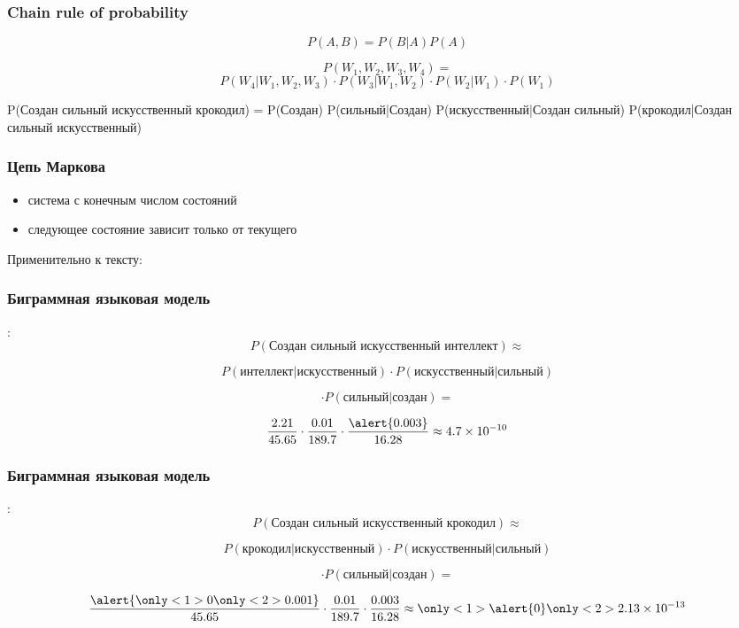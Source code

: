 \documentclass[10pt,svgnames]{beamer}
\begin{document}
\begin{frame}
  \frametitle{Chain rule of probability}
  \begin{equation}
    P(A,B)=P(B|A)P(A)
  \end{equation}

  $$
    P(W_1,W_2,W_3,W_4) = 
    $$
    $$
    P(W_4|W_1,W_2,W_3)  \cdot P(W_3|W_1,W_2)
    \cdot P(W_2|W_1) \cdot P(W_1)
    $$

    P(Создан сильный искусственный крокодил) =
    P(Создан) P(сильный|Создан)
    P(искусственный|Создан сильный)
    P(крокодил|Создан сильный искусственный)
\end{frame}

\begin{frame}
  \frametitle{Цепь Маркова}
  \begin{itemize}
  \item система с конечным числом состояний
  \item следующее состояние зависит только от текущего
  \end{itemize}
  Применительно к тексту: 

\end{frame}


\begin{frame}
  \frametitle{Биграммная языковая модель}
  :
  $$
  P(\text{Создан сильный искусственный интеллект}) \approx
  $$

  $$
  P(\text{интеллект}|\text{искусственный}) \cdot
  P(\text{искусственный}|\text{сильный})
  $$

  $$
  \cdot P(\text{сильный}|\text{создан}) =
  $$

  $$
  \frac{2.21}{45.65} \cdot \frac{0.01}{189.7} \cdot \frac{\alert{0.003}}{16.28} \approx
  4.7 \times 10^{-10}
  $$
\end{frame}

\begin{frame}
  \frametitle{Биграммная языковая модель}
  :
  $$
  P(\text{Создан сильный искусственный крокодил}) \approx
  $$

  $$
  P(\text{крокодил}|\text{искусственный}) \cdot
  P(\text{искусственный}|\text{сильный})
  $$

  $$
  \cdot P(\text{сильный}|\text{создан}) =
  $$

  $$
  \frac{\alert{\only<1>{0}\only<2>{0.001}}}{45.65} \cdot \frac{0.01}{189.7} \cdot \frac{0.003}{16.28} \approx
 \only<1>{\alert{0}} \only<2>{2.13 \times 10^{-13}}
  $$
\end{frame}
\end{document}
